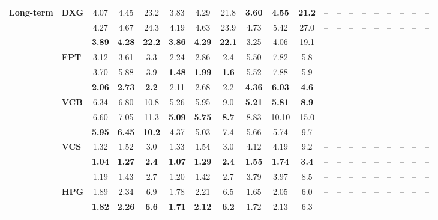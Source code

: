 \begin{table}[!t]
\begin{tabular*}{\textwidth}{@{\extracolsep{\fill}}llccc|ccc|ccc|ccc|ccc|ccc@{}}
\multirow{12}{*}{\textbf{Long-term}}
& \multirow{3}{*}{\textbf{DXG}} 
  & 4.07 & 4.45 & 23.2 & 3.83 & 4.29 & 21.8 & \textbf{3.60} & \textbf{4.55} & \textbf{21.2}
  & -- & -- & -- & -- & -- & -- & -- & -- & -- \\
& 
  & 4.27 & 4.67 & 24.3 & 4.19 & 4.63 & 23.9 & 4.73 & 5.42 & 27.0
  & -- & -- & -- & -- & -- & -- & -- & -- & -- \\
& 
  & \textbf{3.89} & \textbf{4.28} & \textbf{22.2} & \textbf{3.86} & \textbf{4.29} & \textbf{22.1} & 3.25 & 4.06 & 19.1
  & -- & -- & -- & -- & -- & -- & -- & -- & -- \\
& \multirow{3}{*}{\textbf{FPT}} 
  & 3.12 & 3.61 & 3.3 & 2.24 & 2.86 & 2.4 & 5.50 & 7.82 & 5.8
  & -- & -- & -- & -- & -- & -- & -- & -- & -- \\
& 
  & 3.70 & 5.88 & 3.9 & \textbf{1.48} & \textbf{1.99} & \textbf{1.6} & 5.52 & 7.88 & 5.9
  & -- & -- & -- & -- & -- & -- & -- & -- & -- \\
& 
  & \textbf{2.06} & \textbf{2.73} & \textbf{2.2} & 2.11 & 2.68 & 2.2 & \textbf{4.36} & \textbf{6.03} & \textbf{4.6}
  & -- & -- & -- & -- & -- & -- & -- & -- & -- \\
& \multirow{3}{*}{\textbf{VCB}} 
  & 6.34 & 6.80 & 10.8 & 5.26 & 5.95 & 9.0 & \textbf{5.21} & \textbf{5.81} & \textbf{8.9}
  & -- & -- & -- & -- & -- & -- & -- & -- & -- \\
& 
  & 6.60 & 7.05 & 11.3 & \textbf{5.09} & \textbf{5.75} & \textbf{8.7} & 8.83 & 10.10 & 15.0
  & -- & -- & -- & -- & -- & -- & -- & -- & -- \\
& 
  & \textbf{5.95} & \textbf{6.45} & \textbf{10.2} & 4.37 & 5.03 & 7.4 & 5.66 & 5.74 & 9.7
  & -- & -- & -- & -- & -- & -- & -- & -- & -- \\
& \multirow{3}{*}{\textbf{VCS}} 
  & 1.32 & 1.52 & 3.0 & 1.33 & 1.54 & 3.0 & 4.12 & 4.19 & 9.2
  & -- & -- & -- & -- & -- & -- & -- & -- & -- \\
& 
  & \textbf{1.04} & \textbf{1.27} & \textbf{2.4} & \textbf{1.07} & \textbf{1.29} & \textbf{2.4} & \textbf{1.55} & \textbf{1.74} & \textbf{3.4}
  & -- & -- & -- & -- & -- & -- & -- & -- & -- \\
& 
  & 1.19 & 1.43 & 2.7 & 1.20 & 1.42 & 2.7 & 3.79 & 3.97 & 8.5
  & -- & -- & -- & -- & -- & -- & -- & -- & -- \\
& \multirow{3}{*}{\textbf{HPG}} 
  & 1.89 & 2.34 & 6.9 & 1.78 & 2.21 & 6.5 & 1.65 & 2.05 & 6.0
  & -- & -- & -- & -- & -- & -- & -- & -- & -- \\
& 
  & \textbf{1.82} & \textbf{2.26} & \textbf{6.6} & \textbf{1.71} & \textbf{2.12} & \textbf{6.2} & 1.72 & 2.13 & 6.3

\end{tabular*}
\end{table}
